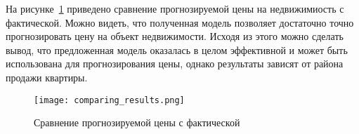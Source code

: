 На рисунке~\ref{fig:experiment:comparing_results} приведено сравнение прогнозируемой цены на недвижимиость
с фактической. Можно видеть, что полученная модель позволяет достаточно точно прогнозировать цену на объект недвижимости.
Исходя из этого можно сделать вывод, что предложенная модель оказалась в целом эффективной и может быть
использована для прогнозирования цены, однако результаты зависят от района продажи квартиры.

\begin{figure}[!ht]
  \centering
  \texttt{[image: comparing\_results.png]}
  \caption{Сравнение прогнозируемой цены с фактической}
  \label{fig:experiment:comparing_results}
\end{figure}
